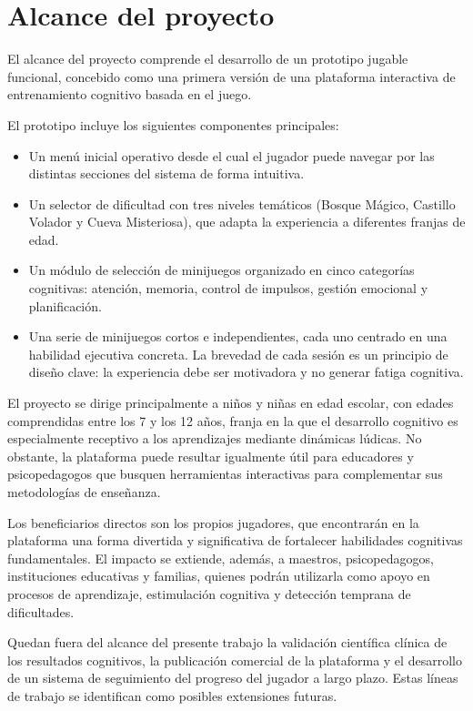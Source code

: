 \documentclass[12pt, a4paper]{report}
\begin{document}
\section{Alcance del proyecto}

El alcance del proyecto comprende el desarrollo de un prototipo jugable
funcional, concebido como una primera versión de una plataforma interactiva
de entrenamiento cognitivo basada en el juego.

El prototipo incluye los siguientes componentes principales:

\begin{itemize}
  \item Un menú inicial operativo desde el cual el jugador puede navegar
    por las distintas secciones del sistema de forma intuitiva.
  \item Un selector de dificultad con tres niveles temáticos (Bosque Mágico,
    Castillo Volador y Cueva Misteriosa), que adapta la experiencia a
    diferentes franjas de edad.
  \item Un módulo de selección de minijuegos organizado en cinco categorías
    cognitivas: atención, memoria, control de impulsos, gestión emocional y
    planificación.
  \item Una serie de minijuegos cortos e independientes, cada uno centrado
    en una habilidad ejecutiva concreta. La brevedad de cada sesión es un
    principio de diseño clave: la experiencia debe ser motivadora y no
    generar fatiga cognitiva.
\end{itemize}

El proyecto se dirige principalmente a niños y niñas en edad escolar, con
edades comprendidas entre los 7 y los 12 años, franja en la que el desarrollo
cognitivo es especialmente receptivo a los aprendizajes mediante dinámicas
lúdicas. No obstante, la plataforma puede resultar igualmente útil para
educadores y psicopedagogos que busquen herramientas interactivas para
complementar sus metodologías de enseñanza.

Los beneficiarios directos son los propios jugadores, que encontrarán en la
plataforma una forma divertida y significativa de fortalecer habilidades
cognitivas fundamentales. El impacto se extiende, además, a maestros,
psicopedagogos, instituciones educativas y familias, quienes podrán utilizarla
como apoyo en procesos de aprendizaje, estimulación cognitiva y detección
temprana de dificultades.

Quedan fuera del alcance del presente trabajo la validación científica clínica
de los resultados cognitivos, la publicación comercial de la plataforma y el
desarrollo de un sistema de seguimiento del progreso del jugador a largo plazo.
Estas líneas de trabajo se identifican como posibles extensiones futuras.
\end{document}
